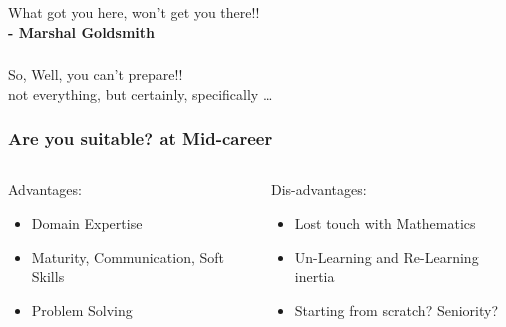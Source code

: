 \begin{frame}[fragile]\frametitle{}
	
	\begin{center}
	{\Large What got you here,  won’t get you there!!} \\
	{\bf - Marshal Goldsmith}
	\end{center}

\end{frame}

\begin{frame}[fragile]\frametitle{}
	
	\begin{center}
	{\Large So, Well, you can’t prepare!!}  \\
	
	not everything, but certainly, specifically \ldots
	\end{center}

\end{frame}


	


\begin{frame}[fragile]\frametitle{Are you suitable? at Mid-career}
\begin{columns}
    \begin{column}[T]{0.5\linewidth}
		Advantages:
      \begin{itemize}
			\item Domain Expertise
			\item Maturity, Communication, Soft Skills
			\item Problem Solving
			\end{itemize}
		\end{column}
    \begin{column}[T]{0.5\linewidth}
		
		Dis-advantages:
      \begin{itemize}
			\item Lost touch with Mathematics
			\item Un-Learning and Re-Learning inertia
			\item Starting from scratch? Seniority?
			\end{itemize}
    \end{column}
  \end{columns}
\end{frame}


